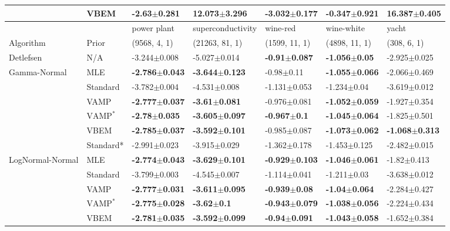 \begin{tabular}{lllllll}
                 & VBEM &           -2.63$\pm$0.281 &           12.073$\pm$3.296 &  \textbf{-3.032$\pm$0.177} &          -0.347$\pm$0.921 &           16.387$\pm$0.405 \\
\midrule
                 &      &                power plant &          superconductivity &                   wine-red &                 wine-white &                      yacht \\
Algorithm & Prior& (9568, 4, 1)& (21263, 81, 1)& (1599, 11, 1)& (4898, 11, 1)& (308, 6, 1)\\
\midrule
Detlefsen & N/A &           -3.244$\pm$0.008 &           -5.027$\pm$0.014 &   \textbf{-0.91$\pm$0.087} &   \textbf{-1.056$\pm$0.05} &           -2.925$\pm$0.025 \\
Gamma-Normal & MLE &  \textbf{-2.786$\pm$0.043} &  \textbf{-3.644$\pm$0.123} &             -0.98$\pm$0.11 &  \textbf{-1.055$\pm$0.066} &           -2.066$\pm$0.469 \\
                 & Standard &           -3.782$\pm$0.004 &           -4.531$\pm$0.008 &           -1.131$\pm$0.053 &            -1.234$\pm$0.04 &           -3.619$\pm$0.012 \\
                 & VAMP &  \textbf{-2.777$\pm$0.037} &   \textbf{-3.61$\pm$0.081} &           -0.976$\pm$0.081 &  \textbf{-1.052$\pm$0.059} &           -1.927$\pm$0.354 \\
                 & $\text{VAMP}^*$ &   \textbf{-2.78$\pm$0.035} &  \textbf{-3.605$\pm$0.097} &    \textbf{-0.967$\pm$0.1} &  \textbf{-1.045$\pm$0.064} &           -1.825$\pm$0.501 \\
                 & VBEM &  \textbf{-2.785$\pm$0.037} &  \textbf{-3.592$\pm$0.101} &           -0.985$\pm$0.087 &  \textbf{-1.073$\pm$0.062} &  \textbf{-1.068$\pm$0.313} \\
                 & Standard* &           -2.991$\pm$0.023 &           -3.915$\pm$0.029 &           -1.362$\pm$0.178 &           -1.453$\pm$0.125 &           -2.482$\pm$0.015 \\
LogNormal-Normal & MLE &  \textbf{-2.774$\pm$0.043} &  \textbf{-3.629$\pm$0.101} &  \textbf{-0.929$\pm$0.103} &  \textbf{-1.046$\pm$0.061} &            -1.82$\pm$0.413 \\
                 & Standard &           -3.799$\pm$0.003 &           -4.545$\pm$0.007 &           -1.114$\pm$0.041 &            -1.211$\pm$0.03 &           -3.638$\pm$0.012 \\
                 & VAMP &  \textbf{-2.777$\pm$0.031} &  \textbf{-3.611$\pm$0.095} &   \textbf{-0.939$\pm$0.08} &   \textbf{-1.04$\pm$0.064} &           -2.284$\pm$0.427 \\
                 & $\text{VAMP}^*$ &  \textbf{-2.775$\pm$0.028} &     \textbf{-3.62$\pm$0.1} &  \textbf{-0.943$\pm$0.079} &  \textbf{-1.038$\pm$0.056} &           -2.224$\pm$0.434 \\
                 & VBEM &  \textbf{-2.781$\pm$0.035} &  \textbf{-3.592$\pm$0.099} &   \textbf{-0.94$\pm$0.091} &  \textbf{-1.043$\pm$0.058} &           -1.652$\pm$0.384 \\
\bottomrule
\end{tabular}

